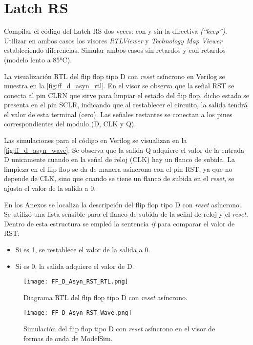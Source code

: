 \section{Latch RS \label{sec:s1}}

\begin{center}
	\begin{minipage}{12cm}
		\begin{tcolorbox}[title=Actividad 1]
			Compilar el código del Latch RS dos veces: con y sin la directiva \textit{(“keep”)}. Utilizar en ambos casos los visores \textit{RTLViewer} y \textit{Technology Map Viewer} estableciendo diferencias. Simular ambos casos sin retardos y con retardos (modelo lento a 85°C). 
		\end{tcolorbox}	
	\end{minipage}
\end{center}

La visualización RTL del flip flop tipo D con \textit{reset} asíncrono en Verilog se muestra en la \autoref{fig:ff_d_asyn_rtl}. En el visor se observa que la señal RST se conecta al pin CLRN que sirve para limpiar el estado del flip flop, dicho estado se presenta en el pin SCLR, indicando que al restablecer el circuito, la salida tendrá el valor de esta terminal (cero). Las señales restantes se conectan a los pines correspondientes del modulo (D, CLK y Q).

Las simulaciones para el código en Verilog se visualizan en la \autoref{fig:ff_d_asyn_wave}. Se observa que la salida Q adquiere el valor de la entrada D unicamente cuando en la señal de reloj (CLK) hay un flanco de subida. La limpieza en el flip flop se da de manera asíncrona con el pin RST, ya que no depende de CLK, sino que cuando se tiene un flanco de subida en el \textit{reset}, se ajusta el valor de la salida a 0.

En los Anexos se localiza la descripción del flip flop tipo D con \textit{reset} asíncrono. Se utilizó una lista sensible para el flanco de subida de la señal de reloj y el \textit{reset}. Dentro de esta estructura se empleó la sentencia \textit{if} para comparar el valor de RST: 
\begin{itemize}
	\item Si es 1, se restablece el valor de la salida a 0. 
	\item Si es 0, la salida adquiere el valor de D.
\end{itemize}

\begin{figure}[ht]
	\centering
	\texttt{[image: FF\_D\_Asyn\_RST\_RTL.png]}
	\caption{Diagrama RTL del flip flop tipo D con \textit{reset} asíncrono. \label{fig:ff_d_asyn_rtl}}
\end{figure}

\begin{figure}[ht]
	\centering
	\texttt{[image: FF\_D\_Asyn\_RST\_Wave.png]}
	\caption{Simulación del flip flop tipo D con \textit{reset} asíncrono en el visor de formas de onda de ModelSim. \label{fig:ff_d_asyn_wave}}
\end{figure}